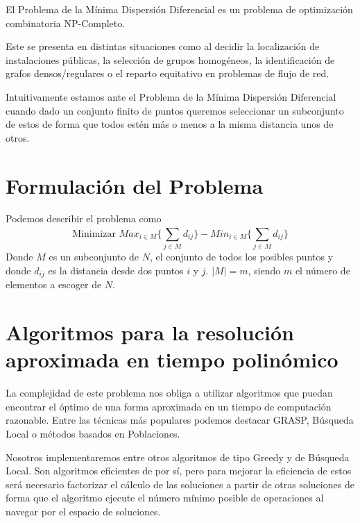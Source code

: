 
El Problema de la Mínima Dispersión Diferencial es un problema de optimización combinatoria NP-Completo.\cite{Seminario2MH}

Este se presenta en distintas situaciones como al decidir la localización de instalaciones públicas,
la selección de grupos homogéneos, la identificación de grafos densos/regulares o el reparto equitativo en problemas de
flujo de red.\cite{DUARTE201546}

Intuitivamente estamos ante el Problema de la Mínima Dispersión Diferencial cuando dado un conjunto finito de puntos queremos
seleccionar un subconjunto de estos de forma que todos estén más o menos a la misma distancia unos de otros.

\section{Formulación del Problema}

Podemos describir el problema como
$$\textrm{Minimizar } Max_{i\in M}\{\sum_{j\in M}^{}d_{ij}\}-Min_{i\in M}\{\sum_{j\in M}^{}d_{ij}\} $$
Donde $M$ es un subconjunto de $N$, el conjunto de todos los posibles puntos y donde $d_{ij}$ es la distancia desde dos puntos $i$ y $j$.
$|M| = m$, siendo $m$ el número de elementos a escoger de $N$.

\section{Algoritmos para la resolución aproximada en tiempo polinómico}

La complejidad de este problema nos obliga a utilizar algoritmos que puedan encontrar el óptimo de una forma aproximada en un tiempo de computación razonable.
Entre las técnicas más populares podemos destacar GRASP, Búsqueda Local o métodos basados en Poblaciones.\cite{MDP2010}

Nosotros implementaremos entre otros algoritmos de tipo Greedy y de Búsqueda Local. Son algoritmos eficientes de por sí, pero para
mejorar la eficiencia de estos será necesario factorizar el cálculo de las soluciones a partir de otras soluciones de forma
que el algoritmo ejecute el número mínimo posible de operaciones al navegar por el espacio de soluciones.